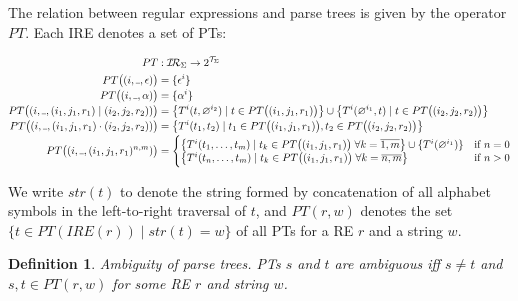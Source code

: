 \documentclass[AMA,STIX1COL]{WileyNJD-v2}
\newcommand{\Xund}{\rule{.4em}{.4pt}}
\newcommand{\XI}{\mathcal{I}}
\newcommand{\XIR}{\XI\!\XR}
\newcommand{\XR}{\mathcal{R}}
\newcommand{\XT}{\mathcal{T}}
\newcommand{\PT}{PT}
\newcommand{\IRE}{I\!RE}
\newtheorem{Xdef}{Definition}
\begin{document}
The relation between regular expressions and parse trees is given by the operator $\PT$.
Each IRE denotes a set of PTs:

    \begin{align*}
        \PT &: \XIR_\Sigma \rightarrow 2^{\XT_\Sigma}
        \\
        \PT\big((i, \Xund, \epsilon)\big) &= \{ {\epsilon}^{i} \}
        \\[-0.2em]
        \PT\big((i, \Xund, \alpha)\big) &= \{ {\alpha}^{i} \}
        \\[-0.2em]
        \PT\big((i, \Xund, (i_1, j_1, r_1) \mid (i_2, j_2, r_2))\big) &=
            \big\{ {T}^{i}(t, \varnothing^{i_2}) \mid t \in \PT\big((i_1, j_1, r_1)\big) \big\} \cup
            \big\{ {T}^{i}(\varnothing^{i_1}, t) \mid t \in \PT\big((i_2, j_2, r_2)\big) \big\}
        \\[-0.2em]
        \PT\big((i, \Xund, (i_1, j_1, r_1) \cdot (i_2, j_2, r_2))\big) &=
            \big\{ {T}^{i}(t_1, t_2) \mid
                t_1 \in \PT\big((i_1, j_1, r_1)\big),
                t_2 \in \PT\big((i_2, j_2, r_2)\big)
            \big\} \\[-0.2em]
        \PT\big((i, \Xund, (i_1, j_1, r_1)^{n, m})\big) &=
            \begin{cases}
                \big\{ {T}^{i}(t_1, \dots, t_m) \mid t_k \in \PT\big((i_1, j_1, r_1)\big) \;
                    \forall k = \overline{1, m} \big\} \cup \{ {T}^{i}(\varnothing^{i_1}) \} &\text{if } n = 0 \\[-0.2em]
                \big\{ {T}^{i}(t_n, \dots, t_m) \mid t_k \in \PT\big((i_1, j_1, r_1)\big) \;
                    \forall k = \overline{n, m} \big\} &\text{if } n > 0
            \end{cases}
    \end{align*}
    \medskip

We write $str(t)$ to denote the string formed by concatenation of all alphabet symbols in the left-to-right traversal of $t$,
and $\PT(r, w)$ denotes the set $\big\{ t \in \PT(\IRE(r)) \mid str(t) = w \big\}$ of all PTs for a RE $r$ and a string $w$.

    \begin{Xdef}\label{ambiguity_of_parse_trees}
    \emph{Ambiguity of parse trees.}
    PTs $s$ and $t$ are \emph{ambiguous} iff $s \neq t$ and $s, t \in PT(r, w)$ for some RE $r$ and string $w$.
    \end{Xdef}
\end{document}
